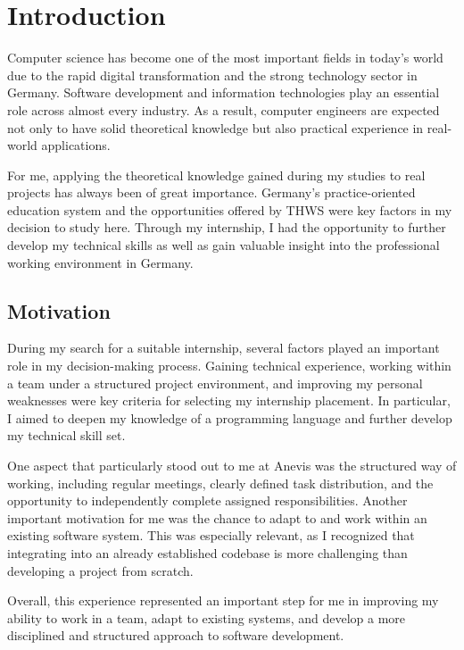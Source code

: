 \chapter{Introduction}

Computer science has become one of the most important fields in today’s world due to the rapid digital transformation and the strong technology sector in Germany. Software development and information technologies play an essential role across almost every industry. As a result, computer engineers are expected not only to have solid theoretical knowledge but also practical experience in real-world applications.

For me, applying the theoretical knowledge gained during my studies to real projects has always been of great importance. Germany’s practice-oriented education system and the opportunities offered by THWS were key factors in my decision to study here. Through my internship, I had the opportunity to further develop my technical skills as well as gain valuable insight into the professional working environment in Germany.

\section{Motivation}
During my search for a suitable internship, several factors played an important role in my decision-making process. Gaining technical experience, working within a team under a structured project environment, and improving my personal weaknesses were key criteria for selecting my internship placement. In particular, I aimed to deepen my knowledge of a programming language and further develop my technical skill set.

One aspect that particularly stood out to me at Anevis was the structured way of working, including regular meetings, clearly defined task distribution, and the opportunity to independently complete assigned responsibilities. Another important motivation for me was the chance to adapt to and work within an existing software system. This was especially relevant, as I recognized that integrating into an already established codebase is more challenging than developing a project from scratch.

Overall, this experience represented an important step for me in improving my ability to work in a team, adapt to existing systems, and develop a more disciplined and structured approach to software development.